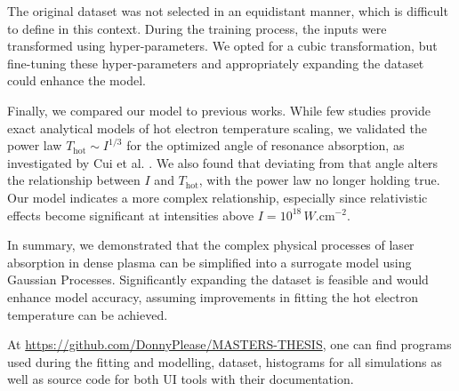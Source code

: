 The original dataset was not selected in an equidistant manner, which is difficult to define in this context. During the training process, the inputs were transformed using hyper-parameters. We opted for a cubic transformation, but fine-tuning these hyper-parameters and appropriately expanding the dataset could enhance the model.

Finally, we compared our model to previous works. While few studies provide exact analytical models of hot electron temperature scaling, we validated the power law $T_\mathrm{hot} \sim I^{1/3}$ for the optimized angle of resonance absorption, as investigated by Cui et al. \cite{cui2013}. We also found that deviating from that angle alters the relationship between $I$ and $T_\mathrm{hot}$, with the power law no longer holding true. Our model indicates a more complex relationship, especially since relativistic effects become significant at intensities above $I = 10^{18}\, W . \mathrm{cm}^{-2}$.

In summary, we demonstrated that the complex physical processes of laser absorption in dense plasma can be simplified into a surrogate model using Gaussian Processes. Significantly expanding the dataset is feasible and would enhance model accuracy, assuming improvements in fitting the hot electron temperature can be achieved.

At \url{https://github.com/DonnyPlease/MASTERS-THESIS}, one can find programs used during the fitting and modelling, dataset, histograms for all simulations as well as source code for both UI tools with their documentation.


